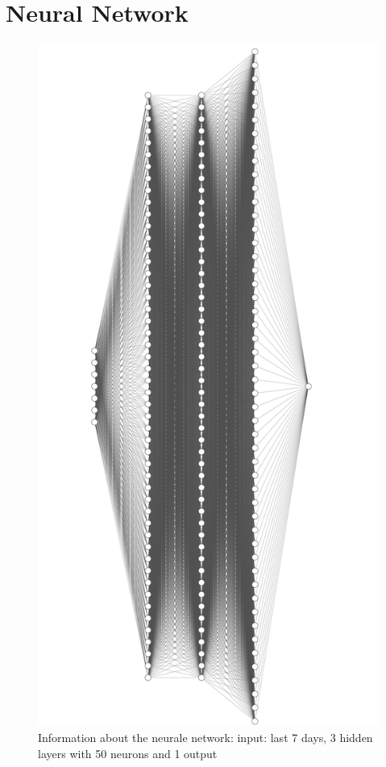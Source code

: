 \documentclass{article}
\begin{document}
\section{Neural Network}
\begin{figure}[H]
  \centering
\includegraphics[scale = 0.1]{NeuralNetwork.jpeg}
\caption{Information about the neurale network: input: last 7 days, 3 hidden layers with 50 neurons and 1 output }
\end{figure}
\end{document}
